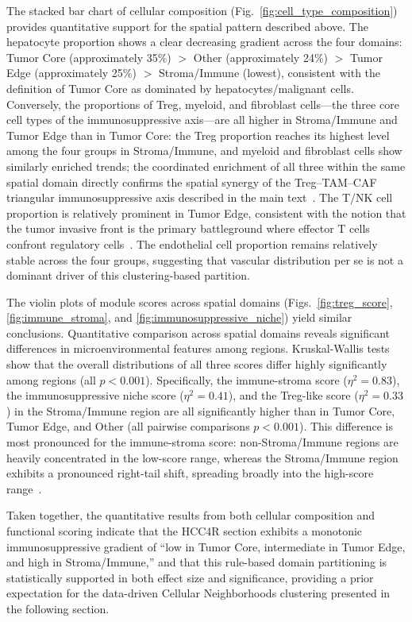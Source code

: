 \documentclass[12pt, a4paper]{article}
\begin{document}
The stacked bar chart of cellular composition (Fig.~\ref{fig:cell_type_composition}) provides quantitative support for the spatial pattern described above. The hepatocyte proportion shows a clear decreasing gradient across the four domains: Tumor Core (approximately 35\%) $>$ Other (approximately 24\%) $>$ Tumor Edge (approximately 25\%) $>$ Stroma/Immune (lowest), consistent with the definition of Tumor Core as dominated by hepatocytes/malignant cells. Conversely, the proportions of Treg, myeloid, and fibroblast cells—the three core cell types of the immunosuppressive axis—are all higher in Stroma/Immune and Tumor Edge than in Tumor Core: the Treg proportion reaches its highest level among the four groups in Stroma/Immune, and myeloid and fibroblast cells show similarly enriched trends; the coordinated enrichment of all three within the same spatial domain directly confirms the spatial synergy of the Treg--TAM--CAF triangular immunosuppressive axis described in the main text~\citep{sakaguchi2020regulatory,noy2014tumor,kalluri2016biology}. The T/NK cell proportion is relatively prominent in Tumor Edge, consistent with the notion that the tumor invasive front is the primary battleground where effector T cells confront regulatory cells~\citep{schurch2020coordinated}. The endothelial cell proportion remains relatively stable across the four groups, suggesting that vascular distribution per se is not a dominant driver of this clustering-based partition.

The violin plots of module scores across spatial domains (Figs.~\ref{fig:treg_score}, \ref{fig:immune_stroma}, and \ref{fig:immunosuppressive_niche}) yield similar conclusions. Quantitative comparison across spatial domains reveals significant differences in microenvironmental features among regions. Kruskal-Wallis tests show that the overall distributions of all three scores differ highly significantly among regions (all $p < 0.001$). Specifically, the immune-stroma score ($\eta^2 = 0.83$), the immunosuppressive niche score ($\eta^2 = 0.41$), and the Treg-like score ($\eta^2 = 0.33$) in the Stroma/Immune region are all significantly higher than in Tumor Core, Tumor Edge, and Other (all pairwise comparisons $p < 0.001$). This difference is most pronounced for the immune-stroma score: non-Stroma/Immune regions are heavily concentrated in the low-score range, whereas the Stroma/Immune region exhibits a pronounced right-tail shift, spreading broadly into the high-score range~\citep{mann1947test}.

Taken together, the quantitative results from both cellular composition and functional scoring indicate that the HCC4R section exhibits a monotonic immunosuppressive gradient of ``low in Tumor Core, intermediate in Tumor Edge, and high in Stroma/Immune,'' and that this rule-based domain partitioning is statistically supported in both effect size and significance, providing a prior expectation for the data-driven Cellular Neighborhoods clustering presented in the following section.
\end{document}
